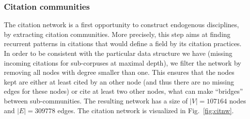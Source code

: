 \subsubsection*{Citation communities}

The citation network is a first opportunity to construct endogenous disciplines, by extracting citation communities. More precisely, this step aims at finding recurrent patterns in citations that would define a field by its citation practices. In order to be consistent with the particular data structure we have (missing incoming citations for sub-corpuses at maximal depth), we filter the network by removing all nodes with degree smaller than one. This ensures that the nodes kept are either at least cited by an other node (and thus there are no missing edges for these nodes) or cite at least two other nodes, what can make ``bridges'' between sub-communities. The resulting network has a size of $\left|V\right| = 107164$ nodes and $\left|E\right| = 309778$ edges. The citation network is visualized in Fig.~\ref{fig:citnw}.



